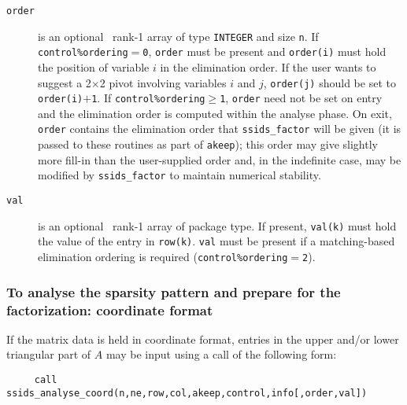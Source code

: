 \documentclass{spral}
\begin{document}
\begin{description}
\item[\texttt{order}] is an optional \intentinout\ rank-1 array of type {\tt INTEGER}
and size  {\tt n}. If
{\tt control\%ordering}$=${\tt 0},  {\tt order} must be present and {\tt order(i)} must
hold the  position of variable $i$  in the elimination order.
If the user wants to suggest a 2$\times$2 pivot involving variables
$i$ and $j$, {\tt order(j)} should be set to {\tt order(i)}$+${\tt 1}.
If {\tt control\%ordering}$\ge${\tt 1}, {\tt order} need not be set on
entry and the elimination order is computed within the analyse phase.
On exit, {\tt order} contains the elimination order that {\tt ssids\_factor}
will be given
(it is passed to these routines as part of {\tt akeep});
this order may give slightly
more fill-in than the user-supplied order and, in the indefinite case,
may be modified by {\tt ssids\_factor}
to maintain numerical stability. 

\item[\texttt{val}] is an optional \intentin\ rank-1 array of package type.
If present,  {\tt val(k)} must hold
the value of the entry in {\tt row(k)}. {\tt val} must be present
if a matching-based elimination ordering is required ({\tt control\%ordering$=$2}).

\end{description}


\subsubsection{To analyse the sparsity pattern and prepare
for the factorization: coordinate format}

If the matrix data is held in coordinate format, entries in the upper
and/or lower triangular part of $A$ may be input using
a call of the following form:
\begin{verbatim}
     call ssids_analyse_coord(n,ne,row,col,akeep,control,info[,order,val])
\end{verbatim}
\end{document}
